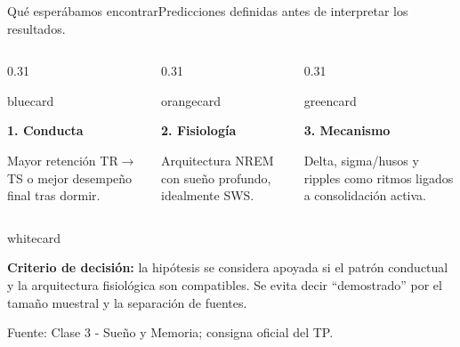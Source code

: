 \documentclass[aspectratio=169,10pt]{beamer}
\newcommand{\source}[1]{\vfill {\tiny\color{Muted}Fuente: #1}}
\newenvironment{card}[2][whitecard]{%
  \begin{beamercolorbox}[wd=#2,sep=0.20cm,rounded=true]{#1}\RaggedRight
}{\end{beamercolorbox}}
\begin{document}
\begin{frame}{Qué esperábamos encontrar}{Predicciones definidas antes de interpretar los resultados.}
\begin{columns}[T,totalwidth=\textwidth]
\begin{column}{0.31\textwidth}
\begin{card}[bluecard]{\linewidth}
{\bfseries 1. Conducta}\par
Mayor retención TR$\rightarrow$TS o mejor desempeño final tras dormir.
\end{card}
\end{column}
\begin{column}{0.31\textwidth}
\begin{card}[orangecard]{\linewidth}
{\bfseries 2. Fisiología}\par
Arquitectura NREM con sueño profundo, idealmente SWS.
\end{card}
\end{column}
\begin{column}{0.31\textwidth}
\begin{card}[greencard]{\linewidth}
{\bfseries 3. Mecanismo}\par
Delta, sigma/husos y ripples como ritmos ligados a consolidación activa.
\end{card}
\end{column}
\end{columns}
\vspace{0.7cm}
\begin{card}[whitecard]{\textwidth}
\textbf{Criterio de decisión:} la hipótesis se considera apoyada si el patrón conductual y la arquitectura fisiológica son compatibles. Se evita decir ``demostrado'' por el tamaño muestral y la separación de fuentes.
\end{card}
\source{Clase 3 - Sueño y Memoria; consigna oficial del TP.}
\end{frame}
\end{document}
